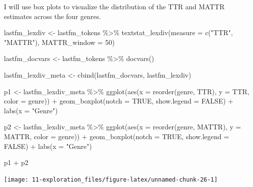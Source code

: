 \documentclass[
]{article}
\newenvironment{Shaded}{\begin{snugshade}}{\end{snugshade}}
\newcommand{\AttributeTok}[1]{\textcolor[rgb]{0.77,0.63,0.00}{#1}}
\newcommand{\ConstantTok}[1]{\textcolor[rgb]{0.00,0.00,0.00}{#1}}
\newcommand{\DecValTok}[1]{\textcolor[rgb]{0.00,0.00,0.81}{#1}}
\newcommand{\FunctionTok}[1]{\textcolor[rgb]{0.00,0.00,0.00}{#1}}
\newcommand{\NormalTok}[1]{#1}
\newcommand{\OtherTok}[1]{\textcolor[rgb]{0.56,0.35,0.01}{#1}}
\newcommand{\SpecialCharTok}[1]{\textcolor[rgb]{0.00,0.00,0.00}{#1}}
\newcommand{\StringTok}[1]{\textcolor[rgb]{0.31,0.60,0.02}{#1}}
\begin{document}
I will use box plots to visualize the distribution of the TTR and MATTR estimates across the four genres.

\begin{Shaded}
\begin{Highlighting}[]
\NormalTok{lastfm\_lexdiv }\OtherTok{\textless{}{-}}\NormalTok{ lastfm\_tokens }\SpecialCharTok{\%\textgreater{}\%}
    \FunctionTok{textstat\_lexdiv}\NormalTok{(}\AttributeTok{measure =} \FunctionTok{c}\NormalTok{(}\StringTok{"TTR"}\NormalTok{, }\StringTok{"MATTR"}\NormalTok{), }\AttributeTok{MATTR\_window =} \DecValTok{50}\NormalTok{)}

\NormalTok{lastfm\_docvars }\OtherTok{\textless{}{-}}\NormalTok{ lastfm\_tokens }\SpecialCharTok{\%\textgreater{}\%}
    \FunctionTok{docvars}\NormalTok{()}

\NormalTok{lastfm\_lexdiv\_meta }\OtherTok{\textless{}{-}} \FunctionTok{cbind}\NormalTok{(lastfm\_docvars, lastfm\_lexdiv)}

\NormalTok{p1 }\OtherTok{\textless{}{-}}\NormalTok{ lastfm\_lexdiv\_meta }\SpecialCharTok{\%\textgreater{}\%}
    \FunctionTok{ggplot}\NormalTok{(}\FunctionTok{aes}\NormalTok{(}\AttributeTok{x =} \FunctionTok{reorder}\NormalTok{(genre, TTR), }\AttributeTok{y =}\NormalTok{ TTR, }\AttributeTok{color =}\NormalTok{ genre)) }\SpecialCharTok{+} \FunctionTok{geom\_boxplot}\NormalTok{(}\AttributeTok{notch =} \ConstantTok{TRUE}\NormalTok{,}
    \AttributeTok{show.legend =} \ConstantTok{FALSE}\NormalTok{) }\SpecialCharTok{+} \FunctionTok{labs}\NormalTok{(}\AttributeTok{x =} \StringTok{"Genre"}\NormalTok{)}

\NormalTok{p2 }\OtherTok{\textless{}{-}}\NormalTok{ lastfm\_lexdiv\_meta }\SpecialCharTok{\%\textgreater{}\%}
    \FunctionTok{ggplot}\NormalTok{(}\FunctionTok{aes}\NormalTok{(}\AttributeTok{x =} \FunctionTok{reorder}\NormalTok{(genre, MATTR), }\AttributeTok{y =}\NormalTok{ MATTR, }\AttributeTok{color =}\NormalTok{ genre)) }\SpecialCharTok{+} \FunctionTok{geom\_boxplot}\NormalTok{(}\AttributeTok{notch =} \ConstantTok{TRUE}\NormalTok{,}
    \AttributeTok{show.legend =} \ConstantTok{FALSE}\NormalTok{) }\SpecialCharTok{+} \FunctionTok{labs}\NormalTok{(}\AttributeTok{x =} \StringTok{"Genre"}\NormalTok{)}

\NormalTok{p1 }\SpecialCharTok{+}\NormalTok{ p2}
\end{Highlighting}
\end{Shaded}

\begin{center}\texttt{[image: 11-exploration\_files/figure-latex/unnamed-chunk-26-1]} \end{center}
\end{document}
